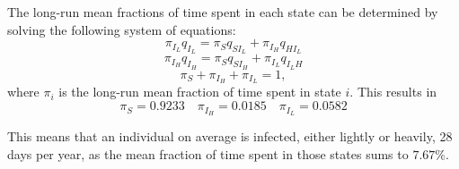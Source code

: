 The long-run mean fractions of time spent in each state can be determined by solving the following system of equations:
$$ \pi_{I_L} q_{I_L} = \pi_S q_{S{I_L}} + \pi_{I_H} q_{H{I_L}}$$
$$ \pi_{I_H} q_{I_H} = \pi_S q_{S{I_H}} + \pi_{I_L} q_{{I_L}H}$$
$$ \pi_S + \pi_{I_H} +\pi_{I_L} = 1, $$
where $\pi_i$ is the long-run mean fraction of time spent in state $i$. This results in 
$$\pi_S = 0.9233 \quad \pi_{I_H} = 0.0185 \quad \pi_{I_L} = 0.0582$$

This means that an individual on average is infected, either lightly or heavily, 28 days per year, as the mean fraction of time spent in those states sums to $7.67\%$.



